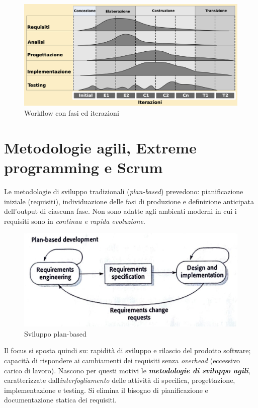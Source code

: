 \begin{figure}[H]
    \centering
    \includegraphics[width=0.75\linewidth]{assets/rup_workflow.png}
    \caption{Workflow con fasi ed iterazioni}
    \label{fig:rup-workflow}
\end{figure}

\newpage

\section{Metodologie agili, Extreme programming e Scrum}

Le metodologie di sviluppo tradizionali (\textit{plan-based}) prevedono: pianificazione iniziale (requisiti), individuazione delle fasi di produzione e definizione anticipata dell'output di ciascuna fase. Non sono adatte agli ambienti moderni in cui i requisiti sono in \textit{continua e rapida evoluzione}.

\begin{figure}[H]
    \centering
    \includegraphics[width=0.75\linewidth]{assets/plan-based.png}
    \caption{Sviluppo plan-based}
    \label{fig:plan-based-dev}
\end{figure}

Il focus si sposta quindi su: rapidità di sviluppo e rilascio del prodotto software; capacità di rispondere ai cambiamenti dei requisiti senza \textit{overhead} (eccessivo carico di lavoro). Nascono per questi motivi le \textit{\textbf{metodologie di sviluppo agili}}, caratterizzate dall\textit{interfogliamento} delle attività di specifica, progettazione, implementazione e testing. Si elimina il bisogno di pianificazione e documentazione statica dei requisiti.


